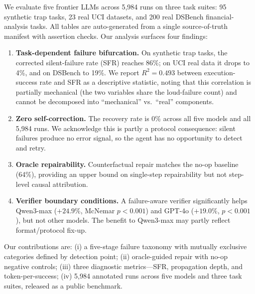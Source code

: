We evaluate five frontier LLMs across 5{,}984 runs on three task suites: 95 synthetic trap tasks, 23 real UCI datasets, and 200 real DSBench financial-analysis tasks. All tables are auto-generated from a single source-of-truth manifest with assertion checks. Our analysis surfaces four findings:

\begin{enumerate}[leftmargin=*,itemsep=2pt]
\item \textbf{Task-dependent failure bifurcation.} On synthetic trap tasks, the corrected silent-failure rate (SFR) reaches 86\%; on UCI real data it drops to 4\%, and on DSBench to 19\%. We report $R^2 = 0.493$ between execution-success rate and SFR as a descriptive statistic, noting that this correlation is partially mechanical (the two variables share the loud-failure count) and cannot be decomposed into ``mechanical'' vs.\ ``real'' components.
\item \textbf{Zero self-correction.} The recovery rate is 0\% across all five models and all 5{,}984 runs. We acknowledge this is partly a protocol consequence: silent failures produce no error signal, so the agent has no opportunity to detect and retry.
\item \textbf{Oracle repairability.} Counterfactual repair matches the no-op baseline (64\%), providing an upper bound on single-step repairability but not step-level causal attribution.
\item \textbf{Verifier boundary conditions.} A failure-aware verifier significantly helps Qwen3-max ($+24.9\%$, McNemar $p<0.001$) and GPT-4o ($+19.0\%$, $p<0.001$), but not other models. The benefit to Qwen3-max may partly reflect format/protocol fix-up.
\end{enumerate}

Our contributions are: (i) a five-stage failure taxonomy with mutually exclusive categories defined by detection point; (ii) oracle-guided repair with no-op negative controls; (iii) three diagnostic metrics---SFR, propagation depth, and token-per-success; (iv) 5{,}984 annotated runs across five models and three task suites, released as a public benchmark.
